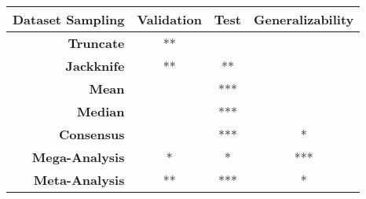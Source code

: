 \begin{tabular}{rccc}
\textbf{Dataset Sampling}  & \textbf{Validation} &      \textbf{Test} & \textbf{Generalizability} \\
\midrule
\textbf{Truncate}          &    {\color{red} **} &                    &                           \\
\textbf{Jackknife}         &    {\color{red} **} &                 ** &                           \\
\textbf{Mean}              &                     &                *** &                           \\
\textbf{Median}            &                     &                *** &                           \\
\textbf{Consensus}         &                     &                *** &                         * \\
\textbf{Mega-Analysis}     &     {\color{red} *} &                  * &                       *** \\
\textbf{Meta-Analysis}     &                  ** &                *** &                         * \\
\end{tabular}
